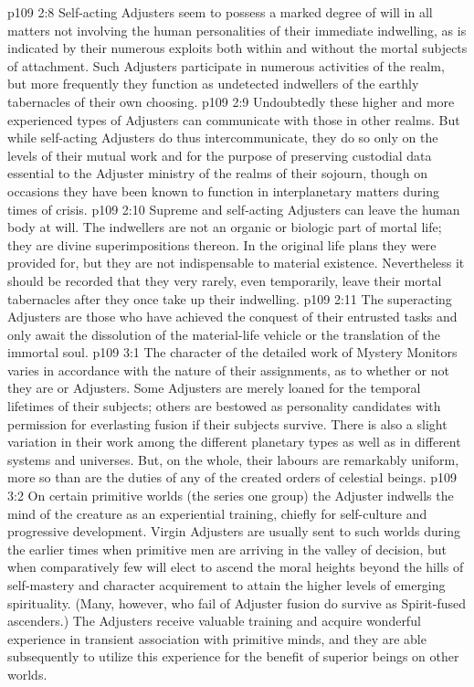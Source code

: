 \vs p109 2:8 \pc Self\hyp{}acting Adjusters seem to possess a marked degree of will in all matters not involving the human personalities of their immediate indwelling, as is indicated by their numerous exploits both within and without the mortal subjects of attachment. Such Adjusters participate in numerous activities of the realm, but more frequently they function as undetected indwellers of the earthly tabernacles of their own choosing.
\vs p109 2:9 Undoubtedly these higher and more experienced types of Adjusters can communicate with those in other realms. But while self\hyp{}acting Adjusters do thus intercommunicate, they do so only on the levels of their mutual work and for the purpose of preserving custodial data essential to the Adjuster ministry of the realms of their sojourn, though on occasions they have been known to function in interplanetary matters during times of crisis.
\vs p109 2:10 Supreme and self\hyp{}acting Adjusters can leave the human body at will. The indwellers are not an organic or biologic part of mortal life; they are divine superimpositions thereon. In the original life plans they were provided for, but they are not indispensable to material existence. Nevertheless it should be recorded that they very rarely, even temporarily, leave their mortal tabernacles after they once take up their indwelling.
\vs p109 2:11 The superacting Adjusters are those who have achieved the conquest of their entrusted tasks and only await the dissolution of the material\hyp{}life vehicle or the translation of the immortal soul.
\vs p109 3:1 The character of the detailed work of Mystery Monitors varies in accordance with the nature of their assignments, as to whether or not they are  or  Adjusters. Some Adjusters are merely loaned for the temporal lifetimes of their subjects; others are bestowed as personality candidates with permission for everlasting fusion if their subjects survive. There is also a slight variation in their work among the different planetary types as well as in different systems and universes. But, on the whole, their labours are remarkably uniform, more so than are the duties of any of the created orders of celestial beings.
\vs p109 3:2 On certain primitive worlds (the series one group) the Adjuster indwells the mind of the creature as an experiential training, chiefly for self\hyp{}culture and progressive development. Virgin Adjusters are usually sent to such worlds during the earlier times when primitive men are arriving in the valley of decision, but when comparatively few will elect to ascend the moral heights beyond the hills of self\hyp{}mastery and character acquirement to attain the higher levels of emerging spirituality. (Many, however, who fail of Adjuster fusion do survive as Spirit\hyp{}fused ascenders.) The Adjusters receive valuable training and acquire wonderful experience in transient association with primitive minds, and they are able subsequently to utilize this experience for the benefit of superior beings on other worlds. 
